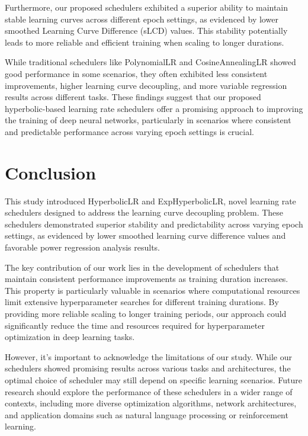 \documentclass{article}
\theoremstyle{plain}
\theoremstyle{definition}
\theoremstyle{remark}
\begin{document}
Furthermore, our proposed schedulers exhibited a superior ability to maintain stable learning curves across different epoch settings, as evidenced by lower smoothed Learning Curve Difference (sLCD) values.
This stability potentially leads to more reliable and efficient training when scaling to longer durations. 

While traditional schedulers like PolynomialLR and CosineAnnealingLR showed good performance in some scenarios, they often exhibited less consistent improvements, higher learning curve decoupling, and more variable regression results across different tasks.
These findings suggest that our proposed hyperbolic-based learning rate schedulers offer a promising approach to improving the training of deep neural networks, particularly in scenarios where consistent and predictable performance across varying epoch settings is crucial.

\section{Conclusion}
\label{sec:conclusion}

This study introduced HyperbolicLR and ExpHyperbolicLR, novel learning rate schedulers designed to address the learning curve decoupling problem. These schedulers demonstrated superior stability and predictability across varying epoch settings, as evidenced by lower smoothed learning curve difference values and favorable power regression analysis results.

The key contribution of our work lies in the development of schedulers that maintain consistent performance improvements as training duration increases. This property is particularly valuable in scenarios where computational resources limit extensive hyperparameter searches for different training durations. By providing more reliable scaling to longer training periods, our approach could significantly reduce the time and resources required for hyperparameter optimization in deep learning tasks.

However, it's important to acknowledge the limitations of our study. While our schedulers showed promising results across various tasks and architectures, the optimal choice of scheduler may still depend on specific learning scenarios. Future research should explore the performance of these schedulers in a wider range of contexts, including more diverse optimization algorithms, network architectures, and application domains such as natural language processing or reinforcement learning.
\end{document}
